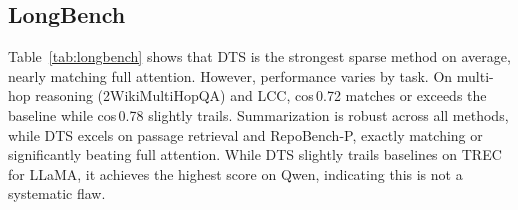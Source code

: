 \subsection{LongBench}
\label{sec:results_longbench}

Table~\ref{tab:longbench} shows that DTS is the strongest sparse method on average, nearly matching full attention. However, performance varies by task. On multi-hop reasoning (2WikiMultiHopQA) and LCC, cos\,0.72 matches or exceeds the baseline while cos\,0.78 slightly trails. Summarization is robust across all methods, while DTS excels on passage retrieval and RepoBench-P, exactly matching or significantly beating full attention. While DTS slightly trails baselines on TREC for LLaMA, it achieves the highest score on Qwen, indicating this is not a systematic flaw.


